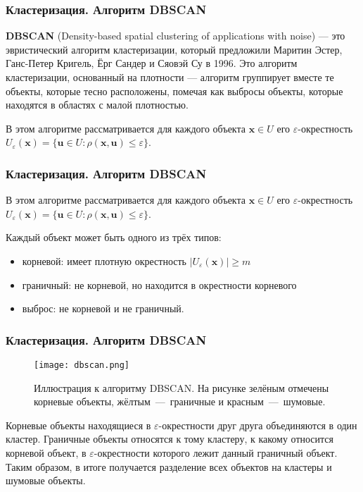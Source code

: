 \documentclass[notheorems, handout]{beamer}
\begin{document}
	\begin{frame}
	\frametitle{Кластеризация. Алгоритм DBSCAN}
	\textbf{DBSCAN} (Density-based spatial clustering of applications with noise) --- это эвристический алгоритм кластеризации, который предложили Маритин Эстер, Ганс-Петер Кригель, Ёрг Сандер и Сяовэй Су в 1996. Это алгоритм кластеризации, основанный на плотности --- алгоритм группирует вместе те объекты, которые тесно расположены, помечая как выбросы объекты, которые находятся в областях с малой плотностью.

	
В этом алгоритме рассматривается для каждого объекта $\pmb x \in U$ его $\varepsilon$-окрестность $U_\varepsilon (\pmb x) = \{\pmb u \in U : \rho(\pmb x , \pmb u ) \leq \varepsilon\}$.
	\end{frame}
	
	\begin{frame}
	\frametitle{Кластеризация. Алгоритм DBSCAN}
	В этом алгоритме рассматривается для каждого объекта $\pmb x \in U$ его $\varepsilon$-окрестность $U_\varepsilon (\pmb x) = \{\pmb u \in U : \rho(\pmb x , \pmb u ) \leq \varepsilon\}$.
	
Каждый объект может быть одного из трёх типов:
	\begin{itemize}
		\item корневой: имеет плотную окрестность $|U_\varepsilon (\pmb x)| \geq m$ 
		\item граничный: не корневой, но находится в окрестности корневого 
		\item выброс: не корневой и не граничный. 
	\end{itemize}
	\end{frame}
	
	\begin{frame}
	\frametitle{Кластеризация. Алгоритм DBSCAN}
	
	\begin{figure}[H]
		\begin{center}
			\texttt{[image: dbscan.png]}
			\caption{Иллюстрация к алгоритму DBSCAN. На рисунке зелёным отмечены корневые объекты, жёлтым~---~граничные и красным~---~шумовые.}
		\end{center}
	\end{figure}
	Корневые объекты находящиеся в $\varepsilon$-окрестности друг друга объединяются в один кластер. Граничные объекты относятся к тому кластеру, к какому относится корневой
	объект, в $\varepsilon$-окрестности которого лежит данный граничный объект. Таким образом, в итоге получается разделение всех объектов на кластеры и шумовые объекты.

	\end{frame}
	
\end{document}
